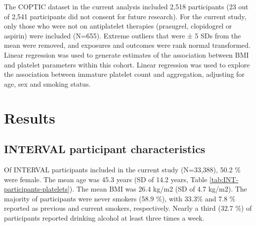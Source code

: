 \documentclass[11pt,twoside]{bristolthesis}
\begin{document}
The COPTIC dataset in the current analysis included 2,518 participants (23 out of 2,541 participants did not consent for future research). For the current study, only those who were not on antiplatelet therapies (prasugrel, clopidogrel or aspirin) were included (N=655). Extreme outliers that were ± 5 SDs from the mean were removed, and exposures and outcomes were rank normal transformed. Linear regression was used to generate estimates of the association between BMI and platelet parameters within this cohort. Linear regression was used to explore the association between immature platelet count and aggregation, adjusting for age, sex and smoking status.

\hypertarget{results}{%
\section{Results}\label{results}}

\hypertarget{interval-participant-characteristics}{%
\subsection{INTERVAL participant characteristics}\label{interval-participant-characteristics}}

Of INTERVAL participants included in the current study (N=33,388), 50.2 \% were female. The mean age was 45.3 years (SD of 14.2 years, Table \ref{tab:INT-participants-platelets}). The mean BMI was 26.4 kg/m2 (SD of 4.7 kg/m2). The majority of participants were never smokers (58.9 \%), with 33.3\% and 7.8 \% reported as previous and current smokers, respectively. Nearly a third (32.7 \%) of participants reported drinking alcohol at least three times a week.
\end{document}
